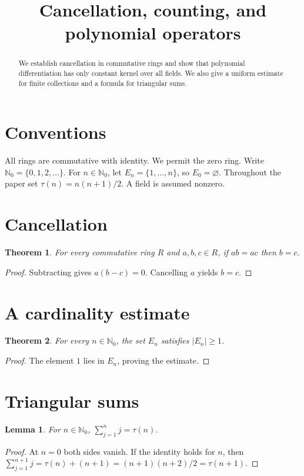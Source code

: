 \documentclass{article}
\title{Cancellation, counting, and polynomial operators}
\newtheorem{theorem}{Theorem}
\newtheorem{lemma}{Lemma}
\begin{document}
\maketitle
\begin{abstract}
We establish cancellation in commutative rings and show that polynomial
differentiation has only constant kernel over all fields. We also give a
uniform estimate for finite collections and a formula for triangular sums.
\end{abstract}
\section{Conventions}
All rings are commutative with identity. We permit the zero ring.
Write $\mathbb N_0=\{0,1,2,\ldots\}$. For $n\in\mathbb N_0$, let
$E_n=\{1,\ldots,n\}$, so $E_0=\varnothing$. Throughout the paper set
$\tau(n)=n(n+1)/2$. A field is assumed nonzero.
\section{Cancellation}
\begin{theorem}\label{thm:cancel}
For every commutative ring $R$ and $a,b,c\in R$, if $ab=ac$ then $b=c$.
\end{theorem}
\begin{proof}
Subtracting gives $a(b-c)=0$. Cancelling $a$ yields $b=c$.
\end{proof}
\section{A cardinality estimate}
\begin{theorem}\label{thm:cardinality}
For every $n\in\mathbb N_0$, the set $E_n$ satisfies $|E_n|\geq 1$.
\end{theorem}
\begin{proof}
The element $1$ lies in $E_n$, proving the estimate.
\end{proof}
\section{Triangular sums}
\begin{lemma}\label{lem:triangular}
For $n\in\mathbb N_0$, $\sum_{j=1}^n j=\tau(n)$.
\end{lemma}
\begin{proof}
At $n=0$ both sides vanish. If the identity holds for $n$, then
$\sum_{j=1}^{n+1}j=\tau(n)+(n+1)=(n+1)(n+2)/2=\tau(n+1)$.
\end{proof}
\end{document}
